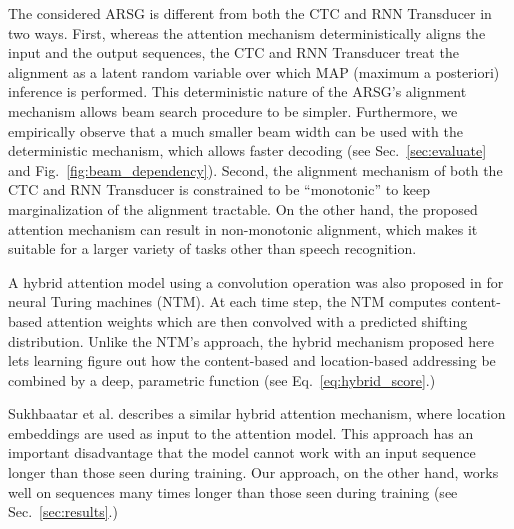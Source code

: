 \documentclass{article} %
\begin{document}
The considered ARSG is different from both the CTC and RNN Transducer in two
ways.  First, whereas the attention mechanism deterministically aligns the input
and the output sequences, the CTC and RNN Transducer treat the alignment as a
latent random variable over which MAP (maximum a posteriori) inference is
performed. This deterministic nature of the ARSG's alignment mechanism allows
beam search procedure to be simpler. Furthermore, we empirically observe that a
much smaller beam width can be used with the deterministic mechanism, which
allows faster decoding (see Sec.~\ref{sec:evaluate} and
Fig.~\ref{fig:beam_dependency}).
Second, the alignment mechanism of both the CTC and RNN Transducer is
constrained to be ``monotonic'' to keep marginalization of the alignment
tractable. On the other hand, the proposed attention mechanism can result in
non-monotonic alignment, which makes it suitable for a larger variety of tasks
other than speech recognition.

A hybrid attention model using a convolution operation was also proposed in
\cite{graves_2014} for neural Turing machines (NTM). At each time step, the NTM
computes content-based attention weights which are then convolved with a
predicted shifting distribution. Unlike the NTM's approach, the hybrid mechanism
proposed here lets learning figure out how the content-based and location-based
addressing be combined by a deep, parametric function (see
Eq.~\eqref{eq:hybrid_score}.) 

Sukhbaatar et al. \cite{sukhbaatar_2015} describes a similar hybrid attention
mechanism, where location embeddings are used as input to the attention model.
This approach has an important disadvantage that the model cannot work with an
input sequence longer than those seen during training. Our approach, on the
other hand, works well on sequences many times longer than those seen during
training (see Sec.~\ref{sec:results}.)


\end{document}
